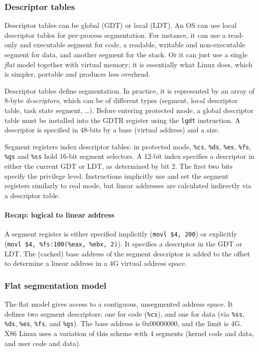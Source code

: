 \documentclass[toc]{../cs-classes/cs-classes}
\begin{document}
\subsubsection{Descriptor tables}
Descriptor tables can be global (GDT) or local (LDT). An OS can use local descriptor tables for per-process segmentation. For instance, it can use a read-only and executable segment for code, a readable, writable and non-executable segment for data, and another segment for the stack. Or it can just use a single \emph{flat} model together with virtual memory; it is essentially what Linux does, which is simpler, portable and produces less overhead.

Descriptor tables define segmentation. In practice, it is represented by an array of 8-byte \emph{descriptors}, which can be of different types (segment, local descriptor table, task state segment, \dots). Before entering protected mode, a global descriptor table must be installed into the GDTR register using the \texttt{lgdt} instruction. A descriptor is specified in 48-bits by a base (virtual address) and a size.

Segment registers index descriptor tables: in protected mode, \texttt{\%cs}, \texttt{\%ds}, \texttt{\%es}, \texttt{\%fs}, \texttt{\%gs} and \texttt{\%ss} hold 16-bit segment selectors. A 12-bit index specifies a descriptor in either the current GDT or LDT, as determined by bit 2. The first two bits specify the privilege level. Instructions implicitly use and set the segment registers similarly to real mode, but linear addresses are calculated indirectly via a descriptor table.

\paragraph*{Recap: logical to linear address} A segment register is either specified implicitly (\texttt{movl \$4, 200}) or explicitly (\texttt{movl \$4, \%fs:100(\%eax, \%ebx, 2)}). It specifies a descriptor in the GDT or LDT. The (cached) base address of the segment descriptor is added to the offset to determine a linear address in a 4G virtual address space.

\subsubsection{Flat segmentation model}
The flat model gives access to a contiguous, unsegmented address space. It defines two segment descriptors: one for code (\texttt{\%cs}), and one for data (via \texttt{\%ss}, \texttt{\%ds}, \texttt{\%es}, \texttt{\%fs}, and \texttt{\%gs}). The base address is 0x00000000, and the limit is 4G. X86 Linux uses a variation of this scheme with 4 segments (kernel code and data, and user code and data).
\end{document}
